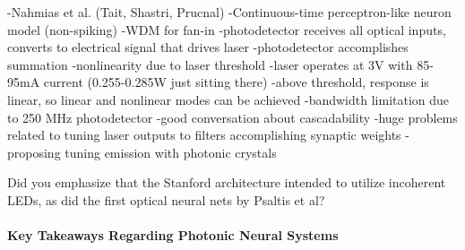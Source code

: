 \cite{nata2016}
-Nahmias et al. (Tait, Shastri, Prucnal)
-Continuous-time perceptron-like neuron model (non-spiking)
-WDM for fan-in
-photodetector receives all optical inputs, converts to electrical signal that drives laser
-photodetector accomplishes summation
-nonlinearity due to laser threshold
-laser operates at 3V with 85-95mA current (0.255-0.285W just sitting there)
-above threshold, response is linear, so linear and nonlinear modes can be achieved
-bandwidth limitation due to 250 MHz photodetector
-good conversation about cascadability
-huge problems related to tuning laser outputs to filters accomplishing synaptic weights
-proposing tuning emission with photonic crystals

\cite{tafe2016}

\cite{fepe2019}

\cite{pena2018} 

\cite{fesh2017}

\cite{wuso2014}

\cite{mebo2015}

\cite{tafe2019}

\cite{rokr2009}

\cite{mawa2014}



\vspace{3em}
Did you emphasize that the Stanford architecture intended to utilize incoherent LEDs, as did the first optical neural nets by Psaltis et al?

\paragraph{Key Takeaways Regarding Photonic Neural Systems}


